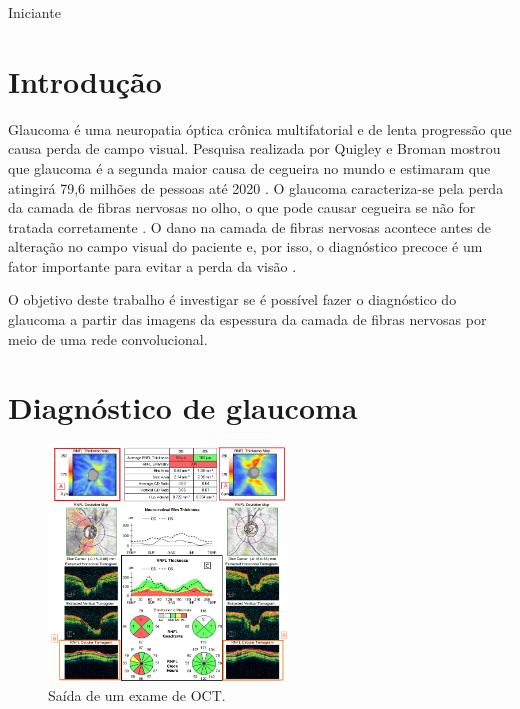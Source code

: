\documentclass[conference]{IEEEtran}
\begin{document}
\renewcommand\IEEEkeywordsname{Categoria}
\begin{IEEEkeywords}
	\label{Categoria}
	Iniciante 
\end{IEEEkeywords}

\IEEEpeerreviewmaketitle


\section{Introdução}


Glaucoma é uma neuropatia óptica crônica multifatorial e de lenta progressão que causa perda de campo visual. Pesquisa realizada por Quigley e Broman mostrou que glaucoma é a segunda maior causa de cegueira no mundo e estimaram que atingirá 79,6 milhões de pessoas até 2020 \cite{Quigley2006}. O glaucoma caracteriza-se pela perda da camada de fibras nervosas no olho, o que pode causar cegueira se não for tratada corretamente \cite{Quigley2011}. O dano na camada de fibras nervosas acontece antes de alteração no campo visual do paciente e, por isso, o diagnóstico precoce é um fator importante para evitar a perda da visão \cite{Malik2012}.

O objetivo deste trabalho é investigar se é possível fazer o diagnóstico do glaucoma a partir das imagens da espessura da camada de fibras nervosas por meio de uma rede convolucional.

\section{Diagnóstico de glaucoma}


\begin{figure}[!tp]
  \centering
  \includegraphics[width=2.5in]{img/oct_regiao.png}
  \caption{Saída de um exame de OCT.}
  \label{fig:oct}
\end{figure}
\end{document}
